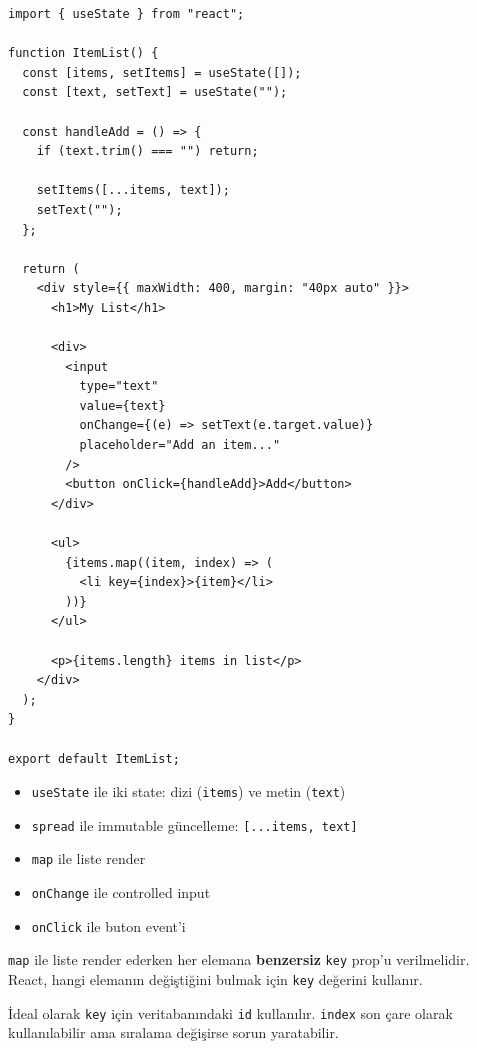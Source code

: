 \documentclass[12pt, a4paper]{article}
\begin{document}
\begin{tcolorbox}[enhanced, colback=codebg, colframe=gray!30,
    colbacktitle=primary!85!black, coltitle=white, arc=4pt,
    title={\sffamily\bfseries\small ItemList.jsx}]
\begin{lstlisting}[style=jsxstyle]
import { useState } from "react";

function ItemList() {
  const [items, setItems] = useState([]);
  const [text, setText] = useState("");

  const handleAdd = () => {
    if (text.trim() === "") return;

    setItems([...items, text]);
    setText("");
  };

  return (
    <div style={{ maxWidth: 400, margin: "40px auto" }}>
      <h1>My List</h1>

      <div>
        <input
          type="text"
          value={text}
          onChange={(e) => setText(e.target.value)}
          placeholder="Add an item..."
        />
        <button onClick={handleAdd}>Add</button>
      </div>

      <ul>
        {items.map((item, index) => (
          <li key={index}>{item}</li>
        ))}
      </ul>

      <p>{items.length} items in list</p>
    </div>
  );
}

export default ItemList;
\end{lstlisting}
\end{tcolorbox}

\vspace{6pt}

\begin{infobox}
\begin{itemize}
  \item \texttt{useState} ile iki state: dizi (\texttt{items}) ve metin (\texttt{text})
  \item \texttt{spread} ile immutable güncelleme: \texttt{[...items, text]}
  \item \texttt{map} ile liste render
  \item \texttt{onChange} ile controlled input
  \item \texttt{onClick} ile buton event'i
\end{itemize}
\end{infobox}

\vspace{6pt}

\begin{warningbox}
\texttt{map} ile liste render ederken her elemana \textbf{benzersiz}
\texttt{key} prop'u verilmelidir. React, hangi elemanın değiştiğini
bulmak için \texttt{key} değerini kullanır.

\vspace{4pt}
İdeal olarak \texttt{key} için veritabanındaki \texttt{id} kullanılır.
\texttt{index} son çare olarak kullanılabilir ama sıralama değişirse
sorun yaratabilir.
\end{warningbox}
\end{document}

